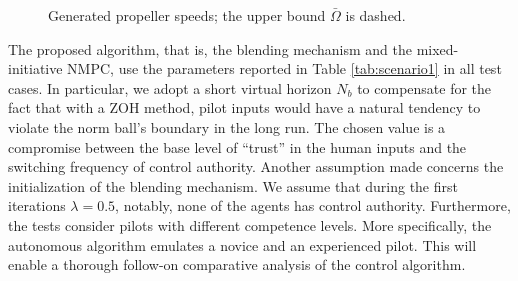 \begin{figure}[t]
	\centering
	\vspace{-0.39cm}
	\caption{Generated propeller speeds; the upper bound $\bar{\Omega}$ is dashed.}\label{fig:prop_speed}%
\end{figure}
The proposed algorithm, that is, the blending mechanism and the mixed-initiative NMPC, use the parameters reported in Table \ref{tab:scenario1} in all test cases. In particular, we adopt a short virtual horizon $N_b$ to compensate for the fact that with a ZOH method, pilot inputs would have a natural tendency to violate the norm ball's boundary in the long run. The chosen value is a compromise between the base level of ``trust'' in the human inputs and the switching frequency of control authority. Another assumption made concerns the initialization of the blending mechanism. We assume that during the first iterations $\lambda = 0.5$, notably, none of the agents has control authority. Furthermore, the tests consider pilots with different competence levels. More specifically, the autonomous algorithm emulates a novice and an experienced pilot. This will enable a thorough follow-on comparative analysis of the control algorithm.    

